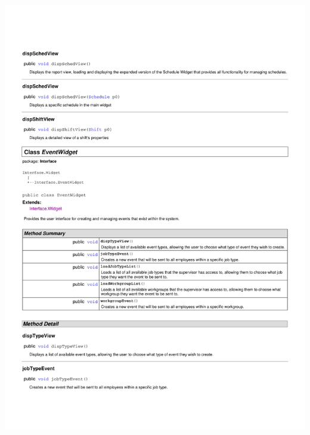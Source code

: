 \documentclass[letterpaper,12pt]{report}
\begin{document}
\includegraphics[scale=0.9,trim=20mm 30mm 25mm 25mm]{externals/InterfaceDataDictionary3.pdf}
\newpage
\end{document}

